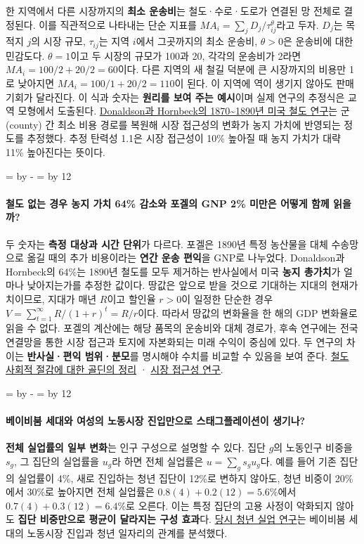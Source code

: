 \documentclass[10pt,a4paper]{article}
\newcommand{\ReserveQuestionSpace}{%
  \par\begingroup
  \dimen0=\pagegoal \advance\dimen0 by -\pagetotal
  \dimen2=\baselineskip \multiply\dimen2 by 12
  \ifdim\dimen0<\dimen2 \newpage\fi
  \endgroup}
\begin{document}
한 지역에서 다른 시장까지의 \textbf{최소 운송비}는 철도·수로·도로가 연결된 망 전체로 결정된다. 이를 직관적으로 나타내는 단순 지표를 $MA_i=\sum_j D_j/\tau_{ij}^{\theta}$라고 두자. $D_j$는 목적지 $j$의 시장 규모, $\tau_{ij}$는 지역 $i$에서 그곳까지의 최소 운송비, $\theta>0$은 운송비에 대한 민감도다. $\theta=1$이고 두 시장의 규모가 100과 20, 각각의 운송비가 2라면 $MA_i=100/2+20/2=60$이다. 다른 지역의 새 철길 덕분에 큰 시장까지의 비용만 1로 낮아지면 $MA_i=100/1+20/2=110$이 된다. 이 지역에 역이 생기지 않아도 판매 기회가 달라진다. 이 식과 숫자는 \textbf{원리를 보여 주는 예시}이며 실제 연구의 추정식은 교역 모형에서 도출된다. \href{https://www.nber.org/papers/w19213}{Donaldson과 Hornbeck의 1870\textasciitilde{}1890년 미국 철도 연구}는 군(county) 간 최소 비용 경로를 복원해 시장 접근성의 변화가 농지 가치에 반영되는 정도를 추정했다. 추정 탄력성 1.1은 시장 접근성이 10\% 높아질 때 농지 가치가 대략 11\% 높아진다는 뜻이다.\par

\ReserveQuestionSpace
\paragraph{철도 없는 경우 농지 가치 64\% 감소와 포겔의 GNP 2\% 미만은 어떻게 함께 읽을까?}

두 숫자는 \textbf{측정 대상과 시간 단위}가 다르다. 포겔은 1890년 특정 농산물을 대체 수송망으로 옮길 때의 추가 비용이라는 \textbf{연간 운송 편익}을 GNP로 나누었다. Donaldson과 Hornbeck의 64\%는 1890년 철도를 모두 제거하는 반사실에서 미국 \textbf{농지 총가치}가 얼마나 낮아지는가를 추정한 값이다. 땅값은 앞으로 받을 것으로 기대하는 지대의 현재가치이므로, 지대가 매년 $R$이고 할인율 $r>0$이 일정한 단순한 경우 $V=\sum_{t=1}^{\infty}R/(1+r)^t=R/r$이다. 따라서 땅값의 변화율을 한 해의 GDP 변화율로 읽을 수 없다. 포겔의 계산에는 해당 품목의 운송비와 대체 경로가, 후속 연구에는 전국 연결망을 통한 시장 접근과 토지에 자본화되는 미래 수익이 중심에 있다. 두 연구의 차이는 \textbf{반사실·편익 범위·분모}를 명시해야 수치를 비교할 수 있음을 보여 준다. \href{https://goldin.scholars.harvard.edu/sites/g/files/omnuum5966/files/goldin/files/cliometrics.pdf}{철도 사회적 절감에 대한 골딘의 정리} · \href{https://www.nber.org/papers/w19213}{시장 접근성 연구}.\par

\ReserveQuestionSpace
\paragraph{베이비붐 세대와 여성의 노동시장 진입만으로 스태그플레이션이 생기나?}
\textbf{전체 실업률의 일부 변화}는 인구 구성으로 설명할 수 있다. 집단 $g$의 노동인구 비중을 $s_g$, 그 집단의 실업률을 $u_g$라 하면 전체 실업률은 $u=\sum_g s_g u_g$다. 예를 들어 기존 집단의 실업률이 4\%, 새로 진입하는 청년 집단이 12\%로 변하지 않아도, 청년 비중이 20\%에서 30\%로 높아지면 전체 실업률은 $0.8(4)+0.2(12)=5.6\%$에서 $0.7(4)+0.3(12)=6.4\%$로 오른다. 이는 특정 집단의 고용 사정이 악화되지 않아도 \textbf{집단 비중만으로 평균이 달라지는 구성 효과}다. \href{https://www.nber.org/papers/w0384}{당시 청년 실업 연구}는 베이비붐 세대의 노동시장 진입과 청년 일자리의 관계를 분석했다.\par
\end{document}
